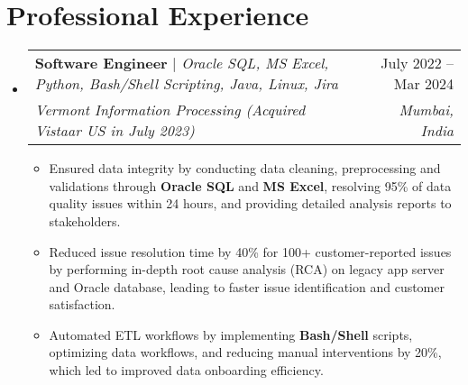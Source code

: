 \documentclass[letterpaper,11pt]{article}
\makeatletter
\newcommand{\resumeItem}[1]{
  \item\small{
    {#1 \vspace{-2pt}}
  }
}
\newcommand{\resumeExperienceSubheading}[5]{
  \vspace{-2pt}\item
    \begin{tabular*}{0.97\textwidth}[t]{l@{\extracolsep{\fill}}r}
      \textbf{#1} \emph{\small#2} & #3 \\
      \textit{\small#4} & \textit{\small #5} \\
    \end{tabular*}\vspace{-7pt}
}
\newcommand{\resumeSubSubheading}[2]{
    \item
    \begin{tabular*}{0.97\textwidth}{l@{\extracolsep{\fill}}r}
      \textit{\small#1} & \textit{\small #2} \\
    \end{tabular*}\vspace{-7pt}
}
\newcommand{\resumeSubHeadingListStart}{\begin{itemize}[leftmargin=0.15in, label={}]}
\newcommand{\resumeSubHeadingListEnd}{\end{itemize}}
\newcommand{\resumeItemListStart}{\begin{itemize}}
\newcommand{\resumeItemListEnd}{\end{itemize}\vspace{-5pt}}
\makeatother
\begin{document}
\section{Professional Experience}
  \resumeSubHeadingListStart

    \resumeExperienceSubheading
      {Software Engineer}{$|$ Oracle SQL, MS Excel, Python, Bash/Shell Scripting, Java, Linux, Jira}{July 2022 -- Mar 2024}
      {Vermont Information Processing (Acquired Vistaar US in July 2023)}{Mumbai, India}
      
      \resumeItemListStart
        \resumeItem{Ensured data integrity by conducting data cleaning, preprocessing and validations through \textbf{Oracle SQL} and \textbf{MS Excel}, resolving 95\% of data quality issues within 24 hours, and providing detailed analysis reports to stakeholders.}\resumeItem{Reduced issue resolution time by 40\% for 100+ customer-reported issues by performing in-depth root cause analysis (RCA) on legacy app server and Oracle database, leading to faster issue identification and customer satisfaction.}
        \resumeItem{Automated ETL workflows by implementing \textbf{Bash/Shell} scripts, optimizing data workflows, and reducing manual interventions by 20\%, which led to improved data onboarding efficiency.}
      \resumeItemListEnd
      

  \resumeSubHeadingListEnd


\end{document}
